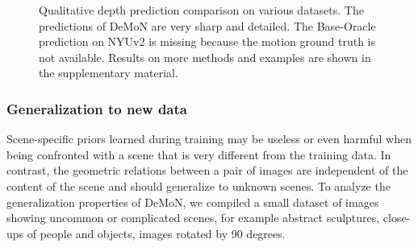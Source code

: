 \documentclass[10pt,twocolumn,letterpaper]{article}
\begin{document}
\begin{figure}
\begin{center}
\end{center}
\vspace{-0.4em}%
\vspace{\capvspace}%
\caption{
 Qualitative depth prediction comparison on various datasets. The predictions of DeMoN are very sharp and detailed.
The Base-Oracle prediction on NYUv2 is missing because the motion ground truth is not available. 
Results on more methods and examples are shown in the supplementary material. %
}
\label{fig:depth_comparison}
\vspace{\figvspace}
\vspace{-0.5em}
\end{figure}





\vspace{-0.3em}%
\subsubsection{Generalization to new data}
\label{sec:generalization}


Scene-specific priors learned during training may be useless or even harmful when being confronted with a scene that is very different from the training data. In contrast, the geometric relations between a pair of images are independent of the content of the scene and should generalize to unknown scenes. 
To analyze the generalization properties of DeMoN, we compiled a small dataset of images showing uncommon or complicated scenes, for example abstract sculptures, close-ups of people and objects, images rotated by 90 degrees.%
\end{document}
